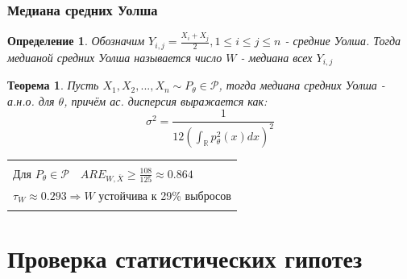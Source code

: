 \documentclass[a4paper,12pt]{article}
\newcommand{\sample}{X_1, X_2, ..., X_n}
\newcommand{\R}{\mathbb{R}}
\newenvironment{annotation}{\begin{center}
    \begin{tabular}{|p{0.9\textwidth}|}
    \hline\\
}
{ 
    \\\\\hline
    \end{tabular} 
    \end{center}
}
\newtheorem{dfn}{Определение}[section]
\theoremstyle{named}
\newtheorem*{namedtheorem}{Теорема}
\begin{document}
\subsubsection{Медиана средних Уолша}
\begin{dfn}
    Обозначим $Y_{i, j} = \frac{X_i + X_j}{2}, 1 \leq i \leq j \leq n$  - средние Уолша. Тогда медианой средних 
    Уолша называется число $W$ - медиана всех $Y_{i, j}$
\end{dfn}
\begin{namedtheorem}
    Пусть $\sample \sim P_\theta \in \mathcal{P}$, тогда медиана средних Уолша - а.н.о. для $\theta$, причём ас. дисперсия 
    выражается как:
    $$
        \sigma^2 = \frac{1}{12\left(\int_\R p_\theta^2(x) dx\right)^2}
    $$
\end{namedtheorem}
\begin{annotation}
    Для $P_\theta \in \mathcal{P} \quad ARE_{W, \overline{X}} \geq \frac{108}{125}\approx 0.864$ \\ 
    $\tau_W \approx 0.293 \Rightarrow W$ устойчива к 29\% выбросов 
\end{annotation}


\section{Проверка статистических гипотез}
\end{document}

